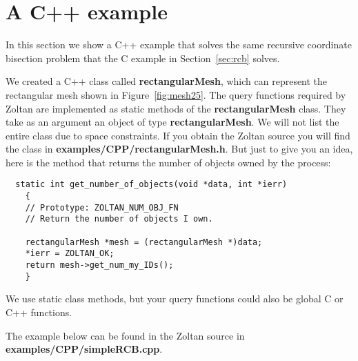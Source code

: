 \clearpage
\section{A C++ example}

In this section we show a C++ example that solves the same
recursive coordinate bisection problem that the C example
in Section~\ref{sec:rcb} solves.

We created a C++ class called \textbf{rectangularMesh}, which can represent
the rectangular mesh shown in Figure~\ref{fig:mesh25}.
The query functions required by Zoltan are implemented as 
static methods of the \textbf{rectangularMesh} class.  They
take as an argument an object of type \textbf{rectangularMesh}.
We will not list the entire class due to space constraints.  If you
obtain the Zoltan source you will find the class in
\textbf{examples/CPP/rectangularMesh.h}.  But just to give you an
idea, here is the method that returns the number of objects
owned by the process:

\begin{flushleft}
\begin{verbatim}
  static int get_number_of_objects(void *data, int *ierr)
    {
    // Prototype: ZOLTAN_NUM_OBJ_FN
    // Return the number of objects I own.
    
    rectangularMesh *mesh = (rectangularMesh *)data;
    *ierr = ZOLTAN_OK;
    return mesh->get_num_my_IDs();
    }
\end{verbatim}
\end{flushleft}

We use static class methods, but your
query functions could also be global C or C++ functions.

The example below can be found in the Zoltan source in 
\textbf{examples/CPP/simpleRCB.cpp}.

